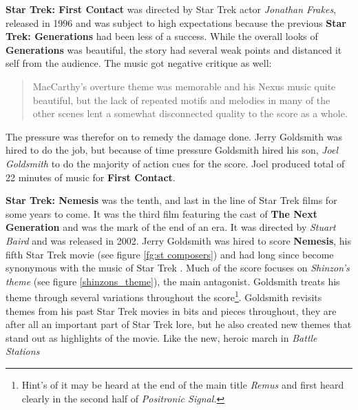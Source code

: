 \textbf{Star Trek: First Contact} was directed by Star Trek actor \textit{Jonathan Frakes}, released in 1996 and was subject to high expectations because the previous \textbf{Star Trek: Generations} had been less of a success. While the overall looks of \textbf{Generations} was beautiful, the story had several weak points and distanced it self from the audience. The music got negative critique as well: \blockquote[{\cite[152]{bond_music_1998}}]
{MacCarthy's overture theme was memorable and his Nexus music quite beautiful, but the lack of repeated motifs and melodies in many of the other scenes lent a somewhat disconnected quality to the score as a whole.}
The pressure was therefor on to remedy the damage done. Jerry Goldsmith was hired to do the job, but because of time pressure Goldsmith hired his son, \textit{Joel Goldsmith} to do the majority of action cues for the score. Joel produced total of 22 minutes of music for \textbf{First Contact}.


\textbf{Star Trek: Nemesis} was the tenth, and last in the line of Star Trek films for some years to come. It was the third film featuring the cast of \textbf{The Next Generation} and was the mark of the end of an era. It was directed by \textit{Stuart Baird} and was released in 2002. Jerry Goldsmith was hired to score \textbf{Nemesis}, his fifth Star Trek movie (see figure \ref{fg:st composers}) and had long since become synonymous with the music of Star Trek \parencite{bond_2013}. Much of the score focuses on \textit{Shinzon's theme} (see figure \ref{shinzons_theme}), the main antagonist. Goldsmith treats his theme through several variations throughout the score\footnote{Hint's of it may be heard at the end of the main title \textit{Remus} and first heard clearly in the second half of \textit{Positronic Signal.}}. Goldsmith revisits themes from his past Star Trek movies in bits and pieces throughout, they are after all an important part of Star Trek lore, but he also created new themes that stand out as highlights of the movie. Like the new, heroic march in \textit{Battle Stations} 

